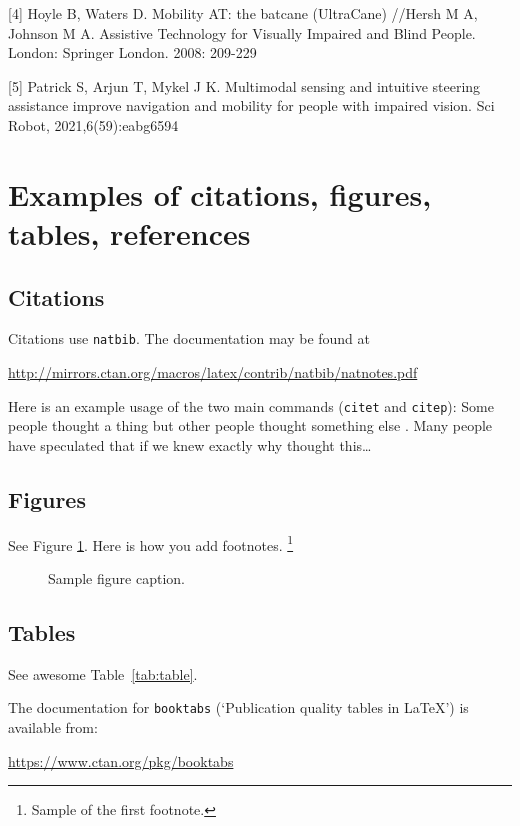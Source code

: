 \documentclass{article}
\begin{document}
[4] Hoyle B, Waters D. Mobility AT: the batcane (UltraCane) //Hersh M A, Johnson M A. Assistive Technology for Visually Impaired and Blind People. London: Springer London. 2008: 209-229

[5] Patrick S, Arjun T, Mykel J K. Multimodal sensing and intuitive steering assistance improve navigation and mobility for people with impaired vision. Sci Robot, 2021,6(59):eabg6594




\section{Examples of citations, figures, tables, references}
\label{sec:others}

\subsection{Citations}
Citations use \verb+natbib+. The documentation may be found at
\begin{center}
	\url{http://mirrors.ctan.org/macros/latex/contrib/natbib/natnotes.pdf}
\end{center}

Here is an example usage of the two main commands (\verb+citet+ and \verb+citep+): Some people thought a thing \citep{kour2014real, keshet2016prediction} but other people thought something else \citep{kour2014fast}. Many people have speculated that if we knew exactly why \citet{kour2014fast} thought this\dots

\subsection{Figures}
\lipsum[10]
See Figure \ref{fig:fig1}. Here is how you add footnotes. \footnote{Sample of the first footnote.}
\lipsum[11]

\begin{figure}
	\centering
	\fbox{\rule[-.5cm]{4cm}{4cm} \rule[-.5cm]{4cm}{0cm}}
	\caption{Sample figure caption.}
	\label{fig:fig1}
\end{figure}

\subsection{Tables}
See awesome Table~\ref{tab:table}.

The documentation for \verb+booktabs+ (`Publication quality tables in LaTeX') is available from:
\begin{center}
	\url{https://www.ctan.org/pkg/booktabs}
\end{center}
\end{document}
